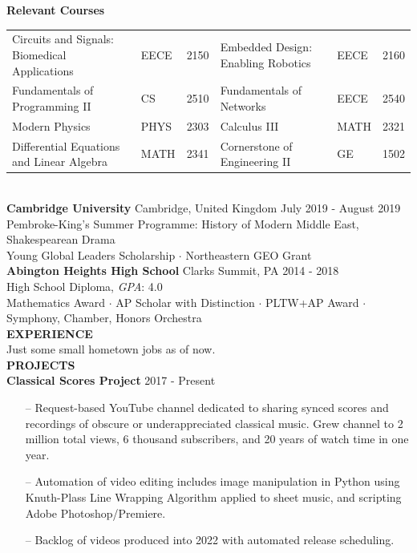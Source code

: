 \documentclass[10pt,a4paper]{article} %
\begin{document}
		\textbf{\large{Relevant Courses}}\\[6pt]
			\setlength\tabcolsep{1.6mm}
			\begin{tabular}{lll|lll}
				Circuits and Signals: Biomedical Applications & EECE & 2150 &
				Embedded Design: Enabling Robotics & EECE & 2160\\
				Fundamentals of Programming II & CS & 2510 &
				Fundamentals of Networks & EECE & 2540\\
				Modern Physics & PHYS & 2303 &
				Calculus III & MATH & 2321\\
				Differential Equations and Linear Algebra & MATH & 2341 & 
				Cornerstone of Engineering II & GE & 1502\\
			\end{tabular}\\[9pt]
		\textbf{\Large{Cambridge University}} Cambridge, United Kingdom \hfill July 2019 - August 2019\\
		Pembroke-King's Summer Programme: History of Modern Middle East, Shakespearean Drama\\
		Young Global Leaders Scholarship $\cdot$ Northeastern GEO Grant\\[12pt]
		\textbf{\Large{Abington Heights High School}} Clarks Summit, PA \hfill 2014 - 2018\\
		High School Diploma, \textit{GPA}: 4.0\\
		Mathematics Award $\cdot$ AP Scholar with Distinction $\cdot$ PLTW+AP Award $\cdot$ Symphony, Chamber, Honors Orchestra\\[12pt]
	\textbf{\LARGE{EXPERIENCE}}\\[6pt]
	Just some small hometown jobs as of now.\\[12pt]
	\textbf{\LARGE{PROJECTS}}\\[6pt]
	\textbf{\Large{Classical Scores Project}}	 \hfill 2017 - Present
		\begin{enumerate}[noitemsep]
			\item[--] Request-based YouTube channel dedicated to sharing synced scores and recordings of obscure or underappreciated classical music. Grew channel to 2 million total views, 6 thousand subscribers, and 20 years of watch time in one year.
			\item[--] Automation of video editing includes image manipulation in Python using Knuth-Plass Line Wrapping Algorithm applied to sheet music, and scripting Adobe Photoshop/Premiere.
			\item[--] Backlog of videos produced into 2022 with automated release scheduling.
		\end{enumerate}
\end{document}
